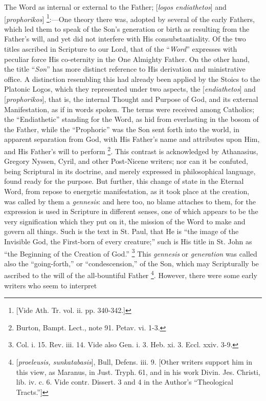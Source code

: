 The Word as internal or external to the Father; [\emph{logos
endiathetos}] and [\emph{prophorikos}] \footnote{[Vide Ath. Tr. vol. ii. pp. 340-342.]}:—One theory there was, adopted by several of the early
Fathers, which led them to speak of the Son's generation or birth as
resulting from the Father's will, and yet did not interfere with His
consubstantiality. Of the two titles ascribed in Scripture to our
Lord, that of the ``\emph{Word}'' expresses with peculiar
force His co-eternity in the One Almighty Father. On the other hand,
the title ``\emph{Son}'' has more distinct reference to
His derivation and ministrative office. A distinction resembling this
had already been applied by the Stoics to the Platonic Logos, which
they represented under two aspects, the [\emph{endiathetos}] and [\emph{prophorikos}],
that is, the internal Thought and Purpose of God, and its external
Manifestation, as if in words spoken. The terms were received among
Catholics; the ``Endiathetic'' standing for the Word, as hid
from everlasting in the bosom of the Father, while the ``Prophoric''
was the Son sent forth into the world, in apparent separation from
God, with His Father's name and attributes upon Him, and His Father's
will to perform \footnote{Burton, Bampt. Lect., note 91. Petav. vi.
1-3.}. This
contrast is acknowledged by Athanasius, Gregory Nyssen, Cyril, and
other Post-Nicene writers; nor can it be confuted, being Scriptural in
its doctrine, and merely expressed in philosophical language, found
ready for the purpose. But further, this change of state in the
Eternal Word, from repose to energetic manifestation, as it took place
at the creation, was called by them a \emph{gennesis}: and here too,
no blame attaches to them, for the expression is used in Scripture in
different senses, one of which appears to be the very signification
which they put on it, the mission of the Word to make and govern all
things. Such is the text in St. Paul, that He is ``the image of
the Invisible God, the First-born of every creature;'' such is His
title in St. John as ``the Beginning of the Creation of God.''
\footnote{Col. i. 15. Rev. iii. 14. Vide also Gen. i.
3. Heb. xi. 3. Eccl. xxiv. 3-9.} This \emph{gennesis}
or \emph{generation} was called also the ``going-forth,''
or ``condescension,'' of the Son, which may Scripturally
be ascribed to the will of the all-bountiful Father \footnote{[\emph{proeleusis, sunkatabasis}], Bull,
Defens. iii. 9. [Other writers support him in this view, as Maranus,
in Just. Tryph. 61, and in his work Divin. Jes. Christi, lib. iv. c.
6. Vide contr. Dissert. 3 and 4 in the Author's ``Theological
Tracts.'']}. However, there were some early writers who seem to interpret
